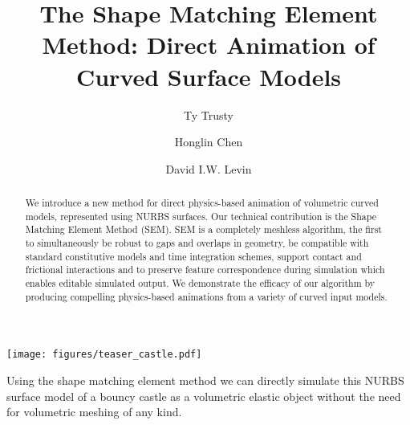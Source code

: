 \documentclass[acmtog, anonymous=true,review=true, nonacm, balance = false]{acmart}
\begin{document}
\title{The Shape Matching Element Method: Direct Animation of Curved Surface Models}

\author{Ty Trusty}
%
\author{Honglin Chen}
%
%
\author{David I.W. Levin}



\begin{teaserfigure}
  \texttt{[image: figures/teaser\_castle.pdf]}
  \caption{Using the shape matching element method we can directly simulate this NURBS surface model of a bouncy castle as a volumetric elastic object without the need for volumetric meshing of any kind.}
  \label{fig:teaser}
\end{teaserfigure}

\begin{abstract}
We introduce a new method for direct physics-based animation of volumetric curved models, represented using NURBS surfaces.  
Our technical contribution is the Shape Matching Element Method (SEM).
SEM is a completely meshless algorithm, the first to simultaneously 
be robust to gaps and overlaps in geometry, 
be compatible with standard constitutive models and time integration schemes, support contact and frictional interactions  
and to preserve feature correspondence during simulation which enables editable simulated output. 
We demonstrate the efficacy of our algorithm by producing compelling physics-based animations from a variety of curved input models.
\end{abstract}

\maketitle










\end{document}

